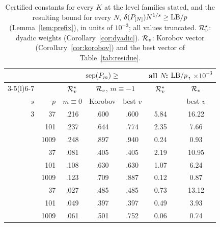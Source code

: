 \begin{table}[t]
\centering
\small
\caption{Certified constants for every $K$ at the level families stated, and the resulting bound for every $N$, $\delta(P_{[N]})N^{1/s}\ge\mathrm{LB}/p$ (Lemma~\ref{lem:prefix}), in units of $10^{-3}$; all values truncated. $\mathcal{R}^{\star}_v$: dyadic weights (Corollary~\ref{cor:dyadic}). $\mathcal{R}_v$: Korobov vector (Corollary~\ref{cor:korobov}) and the best vector of Table~\ref{tab:residue}.}
\label{tab:residuecmp}
\begin{tabular}{@{}rr ccc cc@{}}
\toprule
 & & \multicolumn{3}{c}{$\operatorname{sep}(P_m)\ge$} & \multicolumn{2}{c}{all $N$: $\mathrm{LB}/p$, $\times10^{-3}$}\\
\cmidrule(lr){3-5}\cmidrule(l){6-7}
 & & $\mathcal{R}^{\star}_v$ & \multicolumn{2}{c}{$\mathcal{R}_v$, $m\equiv-1$} & $\mathcal{R}^{\star}_v$ & $\mathcal{R}_v$\\
$s$ & $p$ & $m\equiv0$ & Korobov & best $v$ & & best $v$\\
\midrule
3 & 37 & .216 & .600 & .600 & 5.84 & 16.22\\
 & 101 & .237 & .644 & .774 & 2.35 & 7.66\\
 & 1009 & .248 & .897 & .940 & 0.24 & 0.93\\
\addlinespace
4 & 37 & .081 & .405 & .405 & 2.19 & 10.95\\
 & 101 & .108 & .630 & .630 & 1.07 & 6.24\\
 & 1009 & .123 & .709 & .887 & 0.12 & 0.87\\
\addlinespace
5 & 37 & .027 & .485 & .485 & 0.73 & 13.12\\
 & 101 & .049 & .397 & .397 & 0.49 & 3.93\\
 & 1009 & .061 & .501 & .752 & 0.06 & 0.74\\
\bottomrule
\end{tabular}
\end{table}
